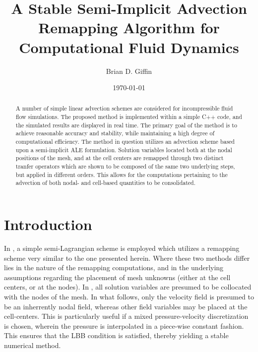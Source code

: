\documentclass[12pt]{article}
\title{\textbf{A Stable Semi-Implicit Advection Remapping Algorithm for Computational Fluid Dynamics}}
\author{Brian D. Giffin}
\date{\today}
\begin{document}

\maketitle


\begin{abstract}
A number of simple linear advection schemes are considered for incompressible fluid flow simulations. The proposed method is implemented within a simple C++ code, and the simulated results are displayed in real time. The primary goal of the method is to achieve reasonable accuracy and stability, while maintaining a high degree of computational efficiency. The method in question utilizes an advection scheme based upon a semi-implicit ALE formulation. Solution variables located both at the nodal positions of the mesh, and at the cell centers are remapped through two distinct tranfer operators which are shown to be composed of the same two underlying steps, but applied in different orders. This allows for the computations pertaining to the advection of both nodal- and cell-based quantities to be consolidated.
\end{abstract}


\section{Introduction}

In \cite{stam_2003}, a simple semi-Lagrangian scheme is employed which utilizes a remapping scheme very similar to the one presented herein. Where these two methods differ lies in the nature of the remapping computations, and in the underlying assumptions regarding the placement of mesh unknowns (either at the cell centers, or at the nodes). In \cite{stam_2003}, all solution variables are presumed to be collocated with the nodes of the mesh. In what follows, only the velocity field is presumed to be an inherrently nodal field, whereas other field variables may be placed at the cell-centers. This is particularly useful if a mixed pressure-velocity discretization is chosen, wherein the pressure is interpolated in a piece-wise constant fashion. This ensures that the LBB condition is satisfied, thereby yielding a stable numerical method.
\end{document}
